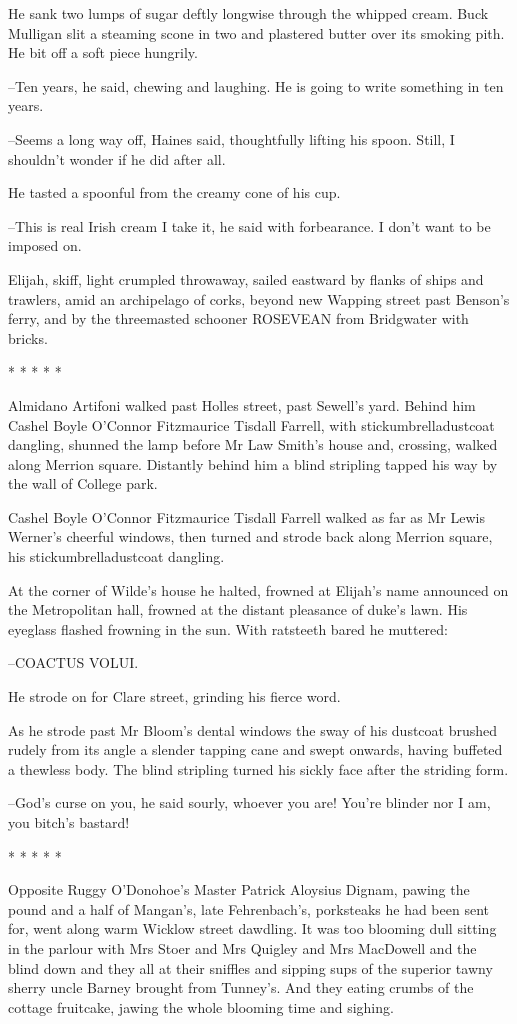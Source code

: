He sank two lumps of sugar deftly longwise through the whipped
cream. Buck Mulligan slit a steaming scone in two and plastered butter
over its smoking pith. He bit off a soft piece hungrily.

--Ten years, he said, chewing and laughing. He is going to write something
in ten years.

--Seems a long way off, Haines said, thoughtfully lifting his spoon.
Still, I shouldn't wonder if he did after all.

He tasted a spoonful from the creamy cone of his cup.

--This is real Irish cream I take it, he said with forbearance.
I don't want to be imposed on.

Elijah, skiff, light crumpled throwaway, sailed eastward by flanks of
ships and trawlers, amid an archipelago of corks, beyond new Wapping
street past Benson's ferry, and by the threemasted schooner ROSEVEAN from
Bridgwater with bricks.


    * * * * *


Almidano Artifoni walked past Holles street, past Sewell's yard.
Behind him Cashel Boyle O'Connor Fitzmaurice Tisdall Farrell, with
stickumbrelladustcoat dangling, shunned the lamp before Mr Law Smith's
house and, crossing, walked along Merrion square. Distantly behind him a
blind stripling tapped his way by the wall of College park.

Cashel Boyle O'Connor Fitzmaurice Tisdall Farrell walked as far as
Mr Lewis Werner's cheerful windows, then turned and strode back along
Merrion square, his stickumbrelladustcoat dangling.

At the corner of Wilde's house he halted, frowned at Elijah's name
announced on the Metropolitan hall, frowned at the distant pleasance of
duke's lawn. His eyeglass flashed frowning in the sun. With ratsteeth
bared he muttered:

--COACTUS VOLUI.

He strode on for Clare street, grinding his fierce word.

As he strode past Mr Bloom's dental windows the sway of his
dustcoat brushed rudely from its angle a slender tapping cane and swept
onwards, having buffeted a thewless body. The blind stripling turned his
sickly face after the striding form.

--God's curse on you, he said sourly, whoever you are! You're blinder nor
I am, you bitch's bastard!


    * * * * *


Opposite Ruggy O'Donohoe's Master Patrick Aloysius Dignam,
pawing the pound and a half of Mangan's, late Fehrenbach's, porksteaks he
had been sent for, went along warm Wicklow street dawdling. It was too
blooming dull sitting in the parlour with Mrs Stoer and Mrs Quigley and
Mrs MacDowell and the blind down and they all at their sniffles and
sipping sups of the superior tawny sherry uncle Barney brought from
Tunney's. And they eating crumbs of the cottage fruitcake, jawing the
whole blooming time and sighing.

